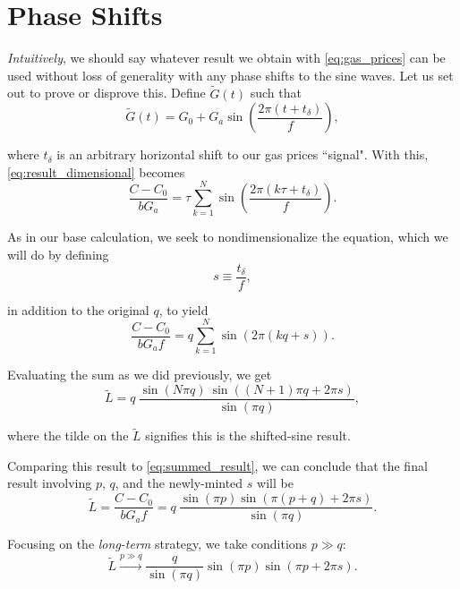 \documentclass[11pt]{article}
\begin{document}
\section*{Phase Shifts}
\label{sec:phase_shifts}
\textit{Intuitively}, we should say whatever result we obtain with \eqref{eq:gas_prices} can be used without loss of generality with any phase shifts to the sine waves. Let us set out to prove or disprove this. Define $\tilde{G}(t)$ such that
\begin{equation}
\tilde{G}(t) = G_0 + G_a \sin \left( \frac{2 \pi (t + t_{\delta})}{f} \right) \label{eq:gas_prices_shifted},
\end{equation} 

where $t_{\delta}$ is an arbitrary horizontal shift to our gas prices ``signal". With this, \eqref{eq:result_dimensional} becomes
\begin{equation}
\frac{C - C_0}{b G_a} = \tau \sum_{k=1}^{N}{\sin \left( \frac{2 \pi (k \tau + t_{\delta})}{f}\right)} \label{eq:result_dimensional_shifted}.
\end{equation}

As in our base calculation, we seek to nondimensionalize the equation, which we will do by defining
$$
s \equiv \frac{t_{\delta}}{f},
$$

in addition to the original $q$, to yield
\begin{equation}
\frac{C - C_0}{b G_a f} = q \sum_{k=1}^{N}{\sin \left( 2 \pi (kq + s) \right)}. \label{eq:result_dimensionless_shifted}
\end{equation}

Evaluating the sum as we did previously, we get
\begin{equation}
\tilde{L} = q \: \frac{\sin(N\pi q) \: \sin((N+1)\pi q + 2\pi s)}{\sin(\pi q)}, \label{eq:summed_result_shifted}
\end{equation}

where the tilde on the $\tilde{L}$ signifies this is the shifted-sine result. \\

\par Comparing this result to \eqref{eq:summed_result}, we can conclude that the final result involving $p$, $q$, and the newly-minted $s$ will be
\begin{equation}
\boxed{\tilde{L} = \frac{C - C_0}{b G_a f} = q \: \frac{\sin(\pi p) \sin(\pi (p+q) + 2\pi s)}{\sin(\pi q)}}. \label{eq:result_final_shifted}
\end{equation}

Focusing on the \textit{long-term} strategy, we take conditions $p \gg q$:
\begin{equation}
\tilde{L} \xrightarrow{p \gg q}  \frac{q}{\sin(\pi q)} \sin(\pi p) \sin(\pi p + 2\pi s).
\end{equation}
\end{document}
